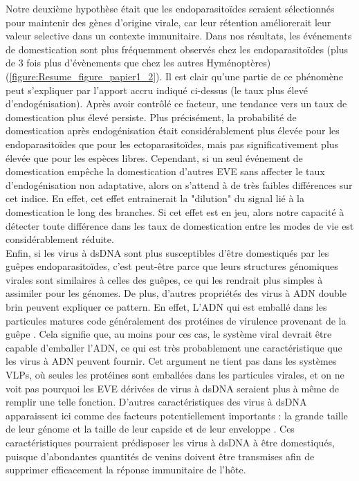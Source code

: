Notre deuxième hypothèse était que les endoparasitoïdes seraient sélectionnés pour maintenir des gènes d'origine virale, car leur rétention améliorerait leur valeur selective dans un contexte immunitaire. Dans nos résultats, les événements de domestication sont plus fréquemment observés chez les endoparasitoïdes (plus de 3 fois plus d'évènements que chez les autres Hyménoptères) (\figurename{\ref{figure:Resume_figure_papier1_2}}). Il est clair qu'une partie de ce phénomène peut s'expliquer par l'apport accru indiqué ci-dessus (le taux plus élevé d'endogénisation). Après avoir contrôlé ce facteur, une tendance vers un taux de domestication plus élevé persiste. Plus précisément, la probabilité de domestication après endogénisation était considérablement plus élevée pour les endoparasitoïdes que pour les ectoparasitoïdes, mais pas significativement plus élevée que pour les espèces libres. Cependant, si un seul événement de domestication empêche la domestication d'autres EVE sans affecter le taux d'endogénisation non adaptative, alors on s'attend à de très faibles différences sur cet indice. En effet, cet effet entrainerait la "dilution" du signal lié à la domestication le long des branches. Si cet effet est en jeu, alors notre capacité à détecter toute différence dans les taux de domestication entre les modes de vie est considérablement réduite.\\

Enfin, si les virus à dsDNA sont plus susceptibles d'être domestiqués par les guêpes endoparasitoïdes, c'est peut-être parce que leurs structures génomiques virales sont similaires à celles des guêpes, ce qui les rendrait plus simples à assimiler pour les génomes. De plus, d'autres propriétés des virus à ADN double brin peuvent expliquer ce pattern. En effet, L'ADN qui est emballé dans les particules matures code généralement des protéines de virulence provenant de la guêpe \citep{espagne_genome_2004}. Cela signifie que, au moins pour ces cas, le système viral devrait être capable d'emballer l'ADN, ce qui est très probablement une caractéristique que les virus à ADN peuvent fournir. Cet argument ne tient pas dans les systèmes VLPs, où seules les protéines sont emballées dans les particules virales, et on ne voit pas pourquoi les EVE dérivées de virus à dsDNA seraient plus à même de remplir une telle fonction. D'autres caractéristiques des virus à dsDNA apparaissent ici comme des facteurs potentiellement importants : la grande taille de leur génome et la taille de leur capside et de leur enveloppe \citep{chaudhari_scaling_2021}. Ces caractéristiques pourraient prédisposer les virus à dsDNA à être domestiqués, puisque d'abondantes quantités de venins doivent être transmises afin de supprimer efficacement la réponse immunitaire de l'hôte.\\

